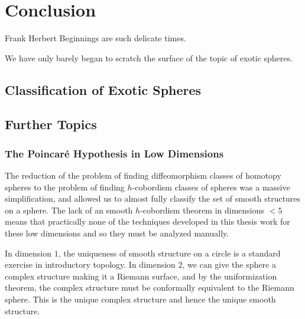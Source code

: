 \chapter{Conclusion}\label{chap:conclusion}

\begin{epigraph}{15em}{Frank Herbert}
	Beginnings are such delicate times.
\end{epigraph}

We have only barely began to scratch the surface of the topic of exotic spheres.

\section{Classification of Exotic Spheres}\label{sec:classification}

\section{Further Topics}

\subsection{The Poincar\'e Hypothesis in Low Dimensions}\label{sec:low-dimensions}

The reduction of the problem of finding diffeomorphism classes of homotopy spheres to the problem of finding $h$-cobordism classes of spheres was a massive simplification, and allowed us to almost fully classify the set of smooth structures on a sphere.
The lack of an smooth $h$-cobordism theorem in dimensions $<5$ means that practically none of the techniques developed in this thesis work for these low dimensions and so they must be analyzed manually. 

In dimension $1$, the uniqueness of smooth structure on a circle is a standard exercise in introductory topology. In dimension $2$, we can give the sphere a complex structure making it a Riemann surface, and by the uniformization theorem, the complex structure must be conformally equivalent to the Riemann sphere. This is the unique complex structure and hence the unique smooth structure.

